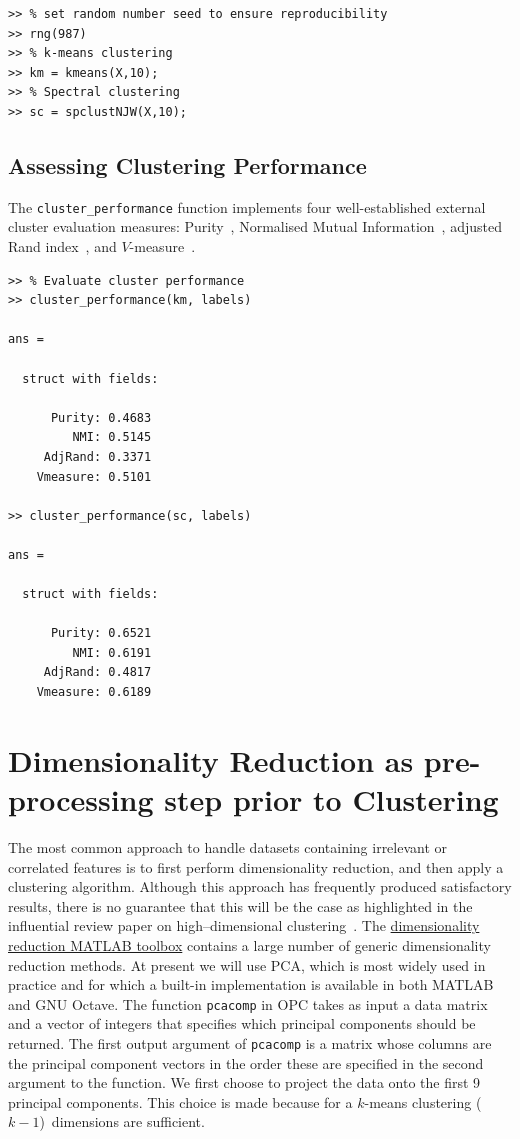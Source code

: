 \documentclass{book}
\begin{document}
\begin{verbatim}
>> % set random number seed to ensure reproducibility
>> rng(987)
>> % k-means clustering
>> km = kmeans(X,10);
>> % Spectral clustering
>> sc = spclustNJW(X,10);
\end{verbatim}

\subsection{Assessing Clustering Performance}

The {\tt cluster\_performance} function implements four well-established
external cluster evaluation measures: Purity~\cite{ZhaoK2004}, Normalised
Mutual Information~\cite{StrehlG2002}, adjusted Rand
index~\cite{Hubert1985}, and $V$-measure~\cite{Rosenberg2007}.


\begin{verbatim}
>> % Evaluate cluster performance
>> cluster_performance(km, labels)

ans = 

  struct with fields:

      Purity: 0.4683
         NMI: 0.5145
     AdjRand: 0.3371
    Vmeasure: 0.5101

>> cluster_performance(sc, labels)

ans = 

  struct with fields:

      Purity: 0.6521
         NMI: 0.6191
     AdjRand: 0.4817
    Vmeasure: 0.6189

\end{verbatim}



\section{Dimensionality Reduction as pre-processing step prior to Clustering}

The most common approach to handle datasets containing irrelevant or correlated
features is to first perform dimensionality reduction, and then apply a
clustering algorithm. Although this approach has frequently produced
satisfactory results, there is no guarantee that this will be the case as highlighted
in the influential review paper on high--dimensional clustering~\cite{KriegelKZ2009}.
%
The \href{https://lvdmaaten.github.io/drtoolbox/}{dimensionality reduction MATLAB
toolbox}
%
contains a large number of generic dimensionality reduction methods. At present we
will use PCA, which is most widely used in practice
and for which a built-in implementation is available in both MATLAB and GNU Octave.
%
The function {\tt pcacomp} in OPC takes as input a data matrix and a vector
of integers that specifies which principal components should be returned.
The first output argument of
{\tt pcacomp} is a matrix whose columns are the principal
component vectors in the order these are specified in the second argument
to the function.
%
We first choose to project the data onto the first 9 principal
components. This choice is made because for a $k$-means clustering 
($k-1$)~dimensions are sufficient.
\end{document}
